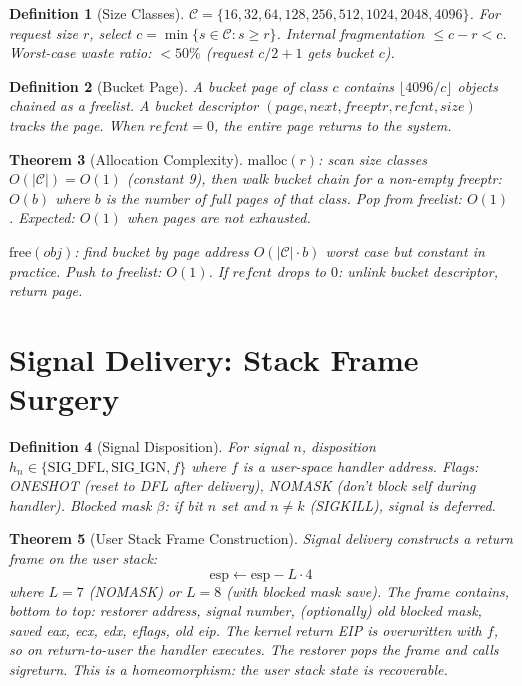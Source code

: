 \documentclass[11pt]{article}
\newtheorem{theorem}{Theorem}[section]
\newtheorem{definition}[theorem]{Definition}
\begin{document}
\begin{definition}[Size Classes]
$\mathcal{C} = \{16, 32, 64, 128, 256, 512, 1024, 2048, 4096\}$.
For request size $r$, select $c = \min\{s \in \mathcal{C} : s \geq r\}$.
Internal fragmentation $\leq c - r < c$.
Worst-case waste ratio: $< 50\%$ (request $c/2 + 1$ gets bucket $c$).
\end{definition}

\begin{definition}[Bucket Page]
A bucket page of class $c$ contains $\lfloor 4096/c \rfloor$ objects
chained as a freelist. A bucket descriptor $(page, next, freeptr, refcnt, size)$
tracks the page. When $refcnt = 0$, the entire page returns to the system.
\end{definition}

\begin{theorem}[Allocation Complexity]
$\text{malloc}(r)$: scan size classes $O(|\mathcal{C}|) = O(1)$ (constant 9),
then walk bucket chain for a non-empty freeptr: $O(b)$ where
$b$ is the number of full pages of that class. Pop from freelist: $O(1)$.
Expected: $O(1)$ when pages are not exhausted.

$\text{free}(obj)$: find bucket by page address $O(|\mathcal{C}| \cdot b)$
worst case but constant in practice. Push to freelist: $O(1)$.
If $refcnt$ drops to $0$: unlink bucket descriptor, return page.
\end{theorem}


\section{Signal Delivery: Stack Frame Surgery}

\begin{definition}[Signal Disposition]
For signal $n$, disposition $h_n \in \{\text{SIG\_DFL}, \text{SIG\_IGN}, f\}$
where $f$ is a user-space handler address. Flags:
ONESHOT (reset to DFL after delivery), NOMASK (don't block self during handler).
Blocked mask $\beta$: if bit $n$ set and $n \neq k$ (SIGKILL), signal is deferred.
\end{definition}

\begin{theorem}[User Stack Frame Construction]
Signal delivery constructs a return frame on the user stack:
\[
  \text{esp} \leftarrow \text{esp} - L \cdot 4
\]
where $L = 7$ (NOMASK) or $L = 8$ (with blocked mask save).
The frame contains, bottom to top: restorer address, signal number,
(optionally) old blocked mask, saved eax, ecx, edx, eflags, old eip.
The kernel return EIP is overwritten with $f$, so on return-to-user
the handler executes. The restorer pops the frame and calls sigreturn.
This is a homeomorphism: the user stack state is recoverable.
\end{theorem}
\end{document}
